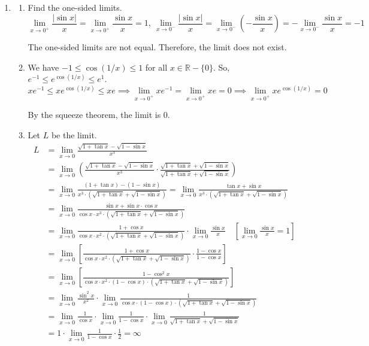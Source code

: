 \documentclass[a4paper, 12pt]{article}
\begin{document}
\begin{enumerate}[leftmargin=*,label=\textbf{\arabic*.}]
\item
\begin{enumerate}[leftmargin=*,label=\textbf{\alph*.}]
\item Find the one-sided limits.
\[\lim_{x\to 0^+} \frac{\left|\sin x\right|}{x}=\lim_{x\to 0^+}\frac{\sin x}{x}=1,\:\lim_{x\to 0^-} \frac{\left|\sin x\right|}{x}=\lim_{x\to0^-}\left(-\frac{\sin x}{x}\right)=-\lim_{x\to0^-}\frac{\sin x}{x}=-1\]

The one-sided limits are not equal. Therefore, the limit does not exist.

\item We have $-1\leq\cos(1/x)\leq1$ for all $x\in\mathbb R-\{0\}$. So, $ e^{-1}\leq e^{\cos(1/x)}\leq e^1$.
\[x e^{-1}\leq x e^{\cos(1/x)}\leq x e\implies\lim_{x\to0^+} x e^{-1}=\lim_{x\to0^+}x e=0\implies\lim_{x\to0^+}x e^{\cos(1/x)}=\boxed0\]

By the squeeze theorem, the limit is 0.
\item Let $L $ be the limit.
\begin{align*}L&=\displaystyle\lim_{x\to0}\frac{\sqrt{1+\tan x}-\sqrt{1-\sin x}}{x^3}
\\[1em]&=\lim_{x\to0}\left(\frac{\sqrt{1+\tan x}-\sqrt{1-\sin x}}{x^3}\cdot\frac{\sqrt{1+\tan x}+\sqrt{1-\sin x}}{\sqrt{1+\tan x}+\sqrt{1-\sin x}}\right)\\[1em]&=\lim_{x\to0}\frac{(1+\tan x)-(1-\sin x)}{x^3\cdot\left(\sqrt{1+\tan x}+\sqrt{1-\sin x}\right)}=\lim_{x\to0}\frac{\tan x+\sin x}{x^3\cdot\left(\sqrt{1+\tan x}+\sqrt{1-\sin x}\right)}\\[1em]&=\lim_{x\to0}\frac{\sin x+\sin x\cdot\cos x}{\cos x\cdot x^3\cdot\left(\sqrt{1+\tan x}+\sqrt{1-\sin x}\right)}\\[1em]&=\lim_{x\to0}\frac{1+\cos x}{\cos x\cdot x^2\cdot\left(\sqrt{1+\tan x}+\sqrt{1-\sin x}\right)}\cdot\lim_{x\to0}\frac{\sin x}{x}\quad\left[\lim_{x\to0}\frac{\sin x}x=1\right]\\[1em]&=\lim_{x\to0}\left[\frac{1+\cos x}{\cos x\cdot x^2\cdot\left(\sqrt{1+\tan x}+\sqrt{1-\sin x}\right)}\cdot\frac{1-\cos x}{1-\cos x}\right]\\[1em]&=\lim_{x\to0}\left[\frac{1-\cos^2x}{\cos x\cdot x^2\cdot(1-\cos x)\cdot\left(\sqrt{1+\tan x}+\sqrt{1-\sin x}\right)}\right]\\[1em]&=\lim_{x\to0}\frac{\sin^2x}{x^2}\cdot\lim_{x\to0}\frac1{\cos x\cdot(1-\cos x)\cdot\left(\sqrt{1+\tan x}+\sqrt{1-\sin x}\right)}\\[1em]&=\lim_{x\to0}\frac1{\cos x}\cdot\lim_{x\to0}\frac1{1-\cos x}\cdot\lim_{x\to0}\frac1{\sqrt{1+\tan x}+\sqrt{1-\sin x}}\\[1em]&=1\cdot\lim_{x\to0}\frac1{1-\cos x}\cdot\frac12 =\boxed{\infty}\end{align*}
\end{enumerate}


\end{enumerate}
\end{document}

